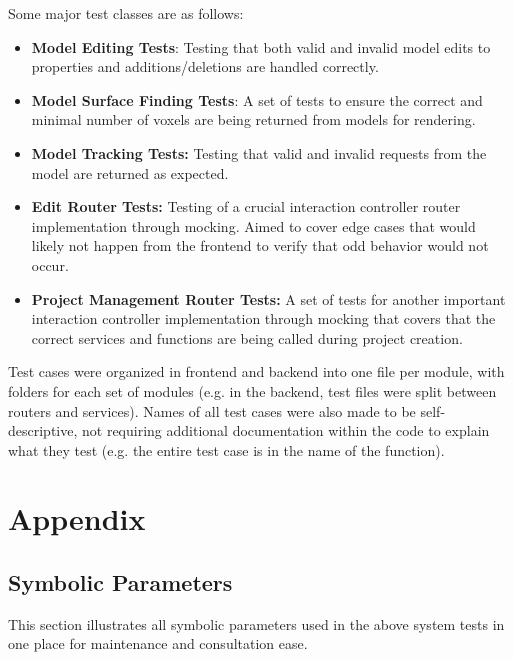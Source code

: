 \documentclass[12pt, titlepage]{article}
\begin{document}
\noindent Some major test classes are as follows:\\

\begin{itemize}
  \item \textbf{Model Editing Tests}: Testing that both valid and invalid model edits to properties and additions/deletions are handled correctly.
  \item \textbf{Model Surface Finding Tests}: A set of tests to ensure the correct and minimal number of voxels are being returned from models for rendering.
  \item \textbf{Model Tracking Tests:} Testing that valid and invalid requests from the model are returned as expected.
  \item \textbf{Edit Router Tests:} Testing of a crucial interaction controller router implementation through mocking. Aimed to cover edge cases that would likely not happen from the frontend to verify that odd behavior would not occur.
  \item \textbf{Project Management Router Tests:} A set of tests for another important interaction controller implementation through mocking that covers that the correct services and functions are being called during project creation.
\end{itemize}

\noindent Test cases were organized in frontend and backend into one file per module, with folders for each set of modules (e.g. in the backend, 
test files were split between routers and services). Names of all test cases were also made to be self-descriptive, not requiring additional documentation within the code to explain what they
test (e.g. the entire test case is in the name of the function). 

\clearpage

				




\clearpage

\section{Appendix}
\subsection{Symbolic Parameters}
This section illustrates all symbolic parameters used in the above system tests in one place for maintenance and consultation ease.
\end{document}
